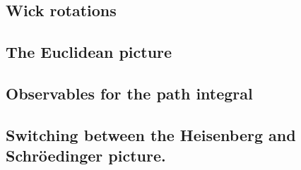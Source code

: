 \subsection{Wick rotations} %

\subsection{The Euclidean picture}

\subsection{Observables for the path integral}

\subsection{Switching between the Heisenberg and Schröedinger picture.}





